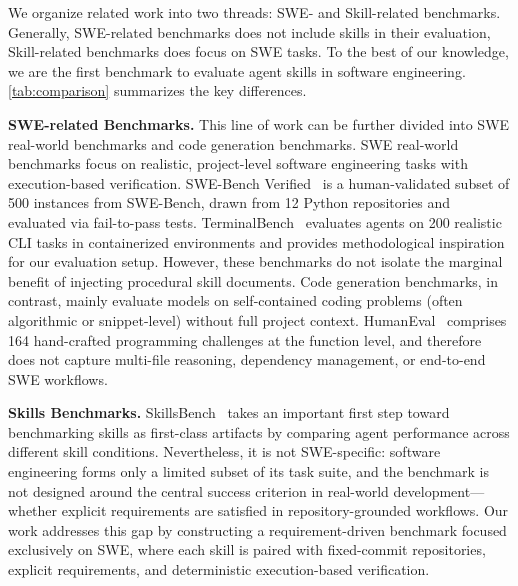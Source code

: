 \documentclass{article}
\begin{document}
We organize related work into two threads: SWE- and Skill-related benchmarks.
Generally, SWE-related benchmarks does not include skills in their evaluation, Skill-related benchmarks does focus on SWE tasks.
To the best of our knowledge, we are the first benchmark to evaluate agent skills in software engineering.
\autoref{tab:comparison} summarizes the key differences.

\textbf{SWE-related Benchmarks.}
This line of work can be further divided into SWE real-world benchmarks and code generation benchmarks.
SWE real-world benchmarks focus on realistic, project-level software engineering tasks with execution-based verification.
SWE-Bench Verified~\cite{jimenez2024swebench} is a human-validated subset of 500 instances from SWE-Bench, drawn from 12 Python repositories and evaluated via fail-to-pass tests.
TerminalBench~\cite{merrill2026terminalbench} evaluates agents on 200 realistic CLI tasks in containerized environments and provides methodological inspiration for our evaluation setup. However, these benchmarks do not isolate the marginal benefit of injecting procedural skill documents.
Code generation benchmarks, in contrast, mainly evaluate models on self-contained coding problems (often algorithmic or snippet-level) without full project context. HumanEval~\cite{chen2021humaneval} comprises 164 hand-crafted programming challenges at the function level, and therefore does not capture multi-file reasoning, dependency management, or end-to-end SWE workflows.

\textbf{Skills Benchmarks.}
SkillsBench~\cite{li2026skillsbench} takes an important first step toward benchmarking skills as first-class artifacts by comparing agent performance across different skill conditions. Nevertheless, it is not SWE-specific: software engineering forms only a limited subset of its task suite, and the benchmark is not designed around the central success criterion in real-world development—whether explicit requirements are satisfied in repository-grounded workflows. Our work addresses this gap by constructing a requirement-driven benchmark focused exclusively on SWE, where each skill is paired with fixed-commit repositories, explicit requirements, and deterministic execution-based verification.

\end{document}
